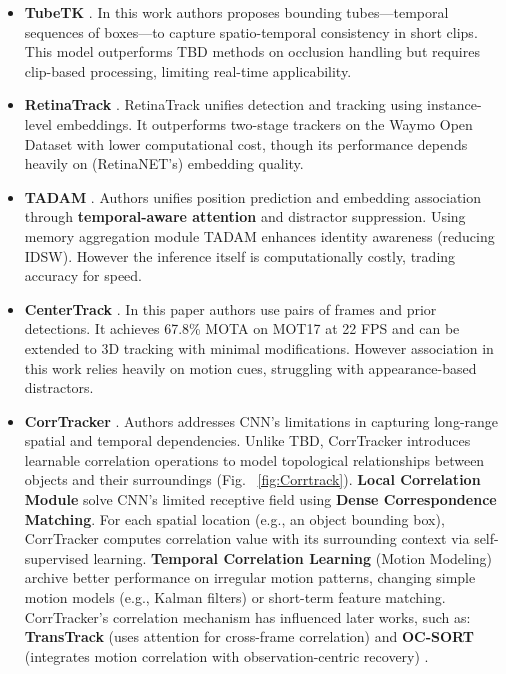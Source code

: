 \documentclass[12pt, a4paper]{article}
\begin{document}
\begin{itemize}
    \item \textbf{TubeTK} \cite{TubeTK}. In this work authors proposes bounding tubes—temporal sequences of boxes—to capture spatio-temporal consistency in short clips. This model outperforms TBD methods on occlusion handling but requires clip-based processing, limiting real-time applicability.

    \item \textbf{RetinaTrack} \cite{RetinaTrack}. RetinaTrack unifies detection and tracking using instance-level embeddings. It outperforms two-stage trackers on the Waymo Open Dataset with lower computational cost, though its performance depends heavily on (RetinaNET's) embedding quality. 

    \item \textbf{TADAM} \cite{TADAM}. Authors unifies position prediction and embedding association through \textbf{temporal-aware attention} and distractor suppression. Using memory aggregation module TADAM enhances identity awareness (reducing IDSW). However the inference itself is computationally costly, trading accuracy for speed.

    \item \textbf{CenterTrack} \cite{CenterTrack}. In this paper authors use pairs of frames and prior detections. It achieves 67.8\% MOTA on MOT17 at 22 FPS and can be extended to 3D tracking with minimal modifications. However association in this work relies heavily on motion cues, struggling with appearance-based distractors.

    \item \textbf{CorrTracker} \cite{CorrTracker}. Authors addresses CNN's limitations in capturing long-range spatial and temporal dependencies. Unlike TBD, CorrTracker introduces learnable correlation operations to model topological relationships between objects and their surroundings (Fig. ~\ref{fig:Corrtrack}). \textbf{Local Correlation Module} solve CNN's limited receptive field using \textbf{Dense Correspondence Matching}. For each spatial location (e.g., an object bounding box), CorrTracker computes correlation value with its surrounding context via self-supervised learning. \textbf{Temporal Correlation Learning} (Motion Modeling) archive better performance on irregular motion patterns, changing simple motion models (e.g., Kalman filters) or short-term feature matching. CorrTracker’s correlation mechanism has influenced later works, such as: \textbf{TransTrack} (uses attention for cross-frame correlation) and \textbf{OC-SORT} (integrates motion correlation with observation-centric recovery) \cite{TransTrack, TransMOT, os-sort}.
\end{itemize}
\end{document}

